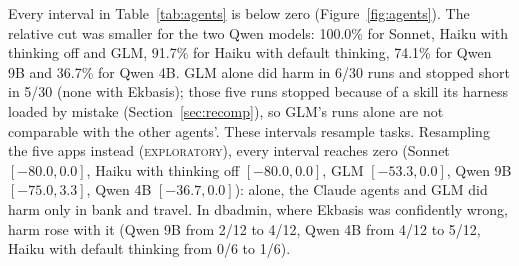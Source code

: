\documentclass[11pt]{article}
\newcommand{\prereg}{\textsc{pre-registered}}
\newcommand{\explo}{\textsc{exploratory}}
\begin{document}
\begin{table}[t]\centering\small
{}
\caption{Five models in six configurations on the fresh demo set. Sonnet and Haiku are \prereg; the GLM and Qwen runs
were made later by a separate session with the same stage, tasks and judge, and were not separately pre-registered
(Section~\ref{sec:recomp}).}\label{tab:agents}
\end{table}

Every interval in Table~\ref{tab:agents} is below zero (Figure~\ref{fig:agents}). The relative cut was smaller for the two
Qwen models: 100.0\% for Sonnet, Haiku with thinking off and GLM, 91.7\% for Haiku with default thinking, 74.1\% for Qwen
9B and 36.7\% for Qwen 4B. GLM alone did harm in 6/30 runs and stopped short in 5/30 (none with Ekbasis); those five
runs stopped because of a skill its harness loaded by mistake (Section~\ref{sec:recomp}), so GLM's runs alone are not
comparable with the other agents'. These intervals resample tasks. Resampling the five apps instead (\explo), every
interval reaches zero (Sonnet $[-80.0, 0.0]$, Haiku with thinking off $[-80.0, 0.0]$, GLM $[-53.3, 0.0]$, Qwen 9B
$[-75.0, 3.3]$, Qwen 4B $[-36.7, 0.0]$): alone, the Claude agents and GLM did harm only in bank and travel. In dbadmin,
where Ekbasis was confidently wrong, harm rose with it (Qwen 9B from 2/12 to 4/12, Qwen 4B from 4/12 to 5/12, Haiku with
default thinking from 0/6 to 1/6).
\end{document}
